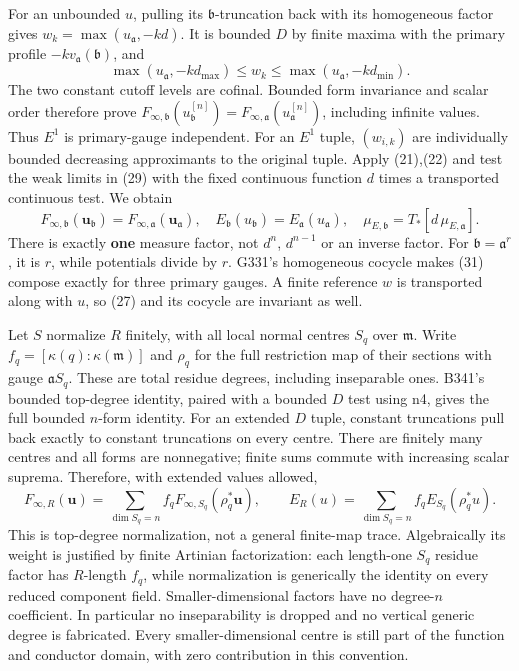 \documentclass[
  11pt,
]{article}
\begin{document}
For an unbounded \(u\), pulling its \(\mathfrak b\)-truncation back with
its homogeneous factor gives \(w_k=\max(u_{\mathfrak a},-kd)\). It is
bounded \(D\) by finite maxima with the primary profile
\(-k v_{\mathfrak a}(\mathfrak b)\), and
\[\max(u_{\mathfrak a},-k d_{\max})\le w_k\le\max(u_{\mathfrak a},-k d_{\min}).\tag{30}\]
The two constant cutoff levels are cofinal. Bounded form invariance and
scalar order therefore prove
\(F_{\infty,\mathfrak b}(u_{\mathfrak b}^{[n]})=F_{\infty,\mathfrak a}(u_{\mathfrak a}^{[n]})\),
including infinite values. Thus \(E^1\) is primary-gauge independent.
For an \(E^1\) tuple, \((w_{i,k})\) are individually bounded decreasing
approximants to the original tuple. Apply (21),(22) and test the weak
limits in (29) with the fixed continuous function \(d\) times a
transported continuous test. We obtain
\[F_{\infty,\mathfrak b}(\boldsymbol u_{\mathfrak b})=F_{\infty,\mathfrak a}(\boldsymbol u_{\mathfrak a}),\quad E_{\mathfrak b}(u_{\mathfrak b})=E_{\mathfrak a}(u_{\mathfrak a}),\quad\mu_{E,\mathfrak b}=T_*[d\,\mu_{E,\mathfrak a}].\tag{31}\]
There is exactly \textbf{one} measure factor, not \(d^n\), \(d^{n-1}\)
or an inverse factor. For \(\mathfrak b=\mathfrak a^r\), it is \(r\),
while potentials divide by \(r\). G331's homogeneous cocycle makes (31)
compose exactly for three primary gauges. A finite reference \(w\) is
transported along with \(u\), so (27) and its cocycle are invariant as
well.

Let \(S\) normalize \(R\) finitely, with all local normal centres
\(S_q\) over \(\mathfrak m\). Write
\(f_q=[\kappa(q):\kappa(\mathfrak m)]\) and \(\rho_q\) for the full
restriction map of their sections with gauge \(\mathfrak aS_q\). These
are total residue degrees, including inseparable ones. B341's bounded
top-degree identity, paired with a bounded \(D\) test using n4, gives
the full bounded \(n\)-form identity. For an extended \(D\) tuple,
constant truncations pull back exactly to constant truncations on every
centre. There are finitely many centres and all forms are nonnegative;
finite sums commute with increasing scalar suprema. Therefore, with
extended values allowed,
\[F_{\infty,R}(\boldsymbol u)=\sum_{\dim S_q=n}f_q F_{\infty,S_q}(\rho_q^*\boldsymbol u),\qquad E_R(u)=\sum_{\dim S_q=n}f_q E_{S_q}(\rho_q^*u).\tag{32}\]
This is top-degree normalization, not a general finite-map trace.
Algebraically its weight is justified by finite Artinian factorization:
each length-one \(S_q\) residue factor has \(R\)-length \(f_q\), while
normalization is generically the identity on every reduced component
field. Smaller-dimensional factors have no degree-\(n\) coefficient. In
particular no inseparability is dropped and no vertical generic degree
is fabricated. Every smaller-dimensional centre is still part of the
function and conductor domain, with zero contribution in this
convention.
\end{document}
